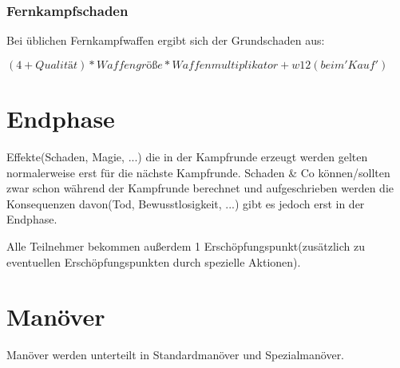 \subsubsection{Fernkampfschaden}
Bei üblichen Fernkampfwaffen ergibt sich der Grundschaden aus:

$(4 + Qualität) * Waffengröße * Waffenmultiplikator + w12(beim 'Kauf')$

\section{Endphase}
Effekte(Schaden, Magie, ...) die in der Kampfrunde erzeugt werden gelten normalerweise erst für die nächste Kampfrunde. Schaden \& Co können/sollten zwar schon während der Kampfrunde berechnet und aufgeschrieben werden die Konsequenzen davon(Tod, Bewusstlosigkeit, ...) gibt es jedoch erst in der Endphase.

Alle Teilnehmer bekommen außerdem 1 Erschöpfungspunkt(zusätzlich zu eventuellen Erschöpfungspunkten durch spezielle Aktionen).

\section{Manöver}
\label{SupportKampfaktionen}
Manöver werden unterteilt in Standardmanöver und Spezialmanöver.

